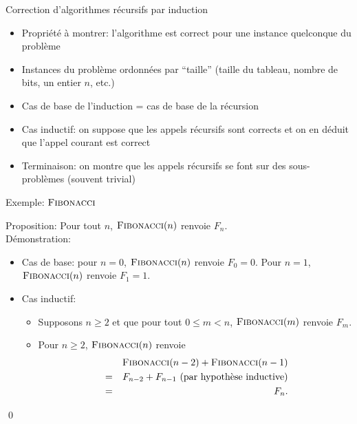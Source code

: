 \begin{frame}{Correction d'algorithmes récursifs par induction}
\begin{itemize}
\item Propriété à montrer: l'algorithme est correct pour une instance quelconque du problème
\item Instances du problème ordonnées par ``taille'' (taille du tableau, nombre de bits, un entier $n$, etc.)
\item Cas de base de l'induction = cas de base de la récursion
\item Cas inductif: on suppose que les appels récursifs sont corrects et on en déduit que l'appel courant est correct
\item Terminaison: on montre que les appels récursifs se font sur des sous-problèmes (souvent trivial)
\end{itemize}
\end{frame}

\begin{frame}{Exemple: $\textnormal{\scshape Fibonacci}$}

\begin{center}\small
{}
\end{center}


Proposition: Pour tout $n$, $\textnormal{\scshape Fibonacci}(n)$ renvoie $F_n$.\\

Démonstration:
\begin{itemize}
\item Cas de base: pour $n=0$, $\textnormal{\scshape Fibonacci}(n)$ renvoie $F_0=0$. Pour $n=1$, $\textnormal{\scshape Fibonacci}(n)$ renvoie $F_1=1$.
\item Cas inductif:
\begin{itemize}
\item Supposons $n\geq 2$ et que pour tout $0\leq m< n$, $\textnormal{\scshape Fibonacci}(m)$ renvoie $F_m$.
\item Pour $n\geq 2$, $\textnormal{\scshape Fibonacci}(n)$ renvoie
\begin{eqnarray*}
&&\textnormal{\scshape Fibonacci}(n-2)+\textnormal{\scshape Fibonacci}(n-1)\\
&=& F_{n-2}+F_{n-1} \mbox{ (par hypothèse inductive)}\\
&=& F_n.
\end{eqnarray*}
\end{itemize}
\end{itemize}\qed

\end{frame}

